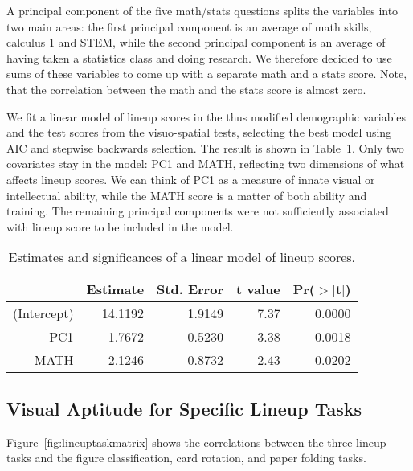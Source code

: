 \documentclass[journal]{vgtc}\usepackage[]{graphicx}\usepackage[]{color}
\begin{document}
A principal component of the five math/stats questions splits the variables into two main areas: the first principal component is an average of math skills, calculus 1 and STEM, while the second principal component is an average of having taken a statistics class and doing research. We therefore decided to use sums of these variables to come up with a separate math and a stats score. Note, that the correlation between the math and the stats score is almost zero. 

We fit a linear model of lineup scores in the thus modified demographic variables and the test scores from the visuo-spatial tests, selecting the best model using AIC and stepwise backwards selection. The result is shown in Table~\ref{tab:m1}. Only two covariates stay in the model: PC1 and MATH, reflecting two dimensions of what affects lineup scores. We can think of PC1 as a measure of innate visual or intellectual ability, while the MATH score is a matter of both ability and training. The remaining principal components were not sufficiently associated with lineup score to be included in the model.

\begin{table}[ht]
\centering
\caption{Estimates and significances of a linear model of lineup scores.} 
\label{tab:m1}
\begin{tabular}{rrrrr}
  \hline
 & Estimate & Std. Error & t value & Pr($>$$|$t$|$) \\ 
  \hline
(Intercept) & 14.1192 & 1.9149 & 7.37 & 0.0000 \\ 
  PC1 & 1.7672 & 0.5230 & 3.38 & 0.0018 \\ 
  MATH & 2.1246 & 0.8732 & 2.43 & 0.0202 \\ 
   \hline
\end{tabular}
\end{table}

%
\subsection{Visual Aptitude for Specific Lineup Tasks}
Figure~\ref{fig:lineuptaskmatrix} shows the correlations between the three lineup tasks and the figure classification, card rotation, and paper folding tasks. 
\end{document}
